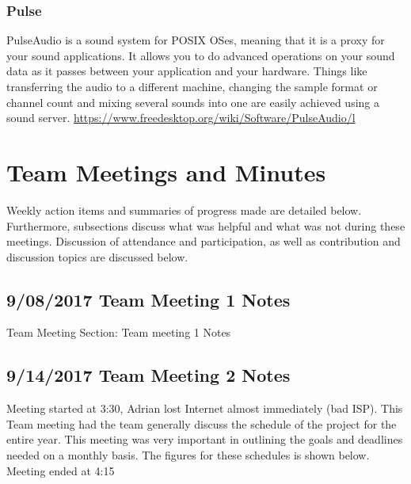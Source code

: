 \documentclass[12pt]{article}
\begin{document}
		\subsubsection{Pulse}
		 PulseAudio is a sound system for POSIX OSes, meaning that it is a proxy for your sound applications. It allows you to do advanced operations on your sound data as it passes between your application and your hardware. Things like transferring the audio to a different machine, changing the sample format or channel count and mixing several sounds into one are easily achieved using a sound server. \url{https://www.freedesktop.org/wiki/Software/PulseAudio/l}
		
	\newpage

\section{Team Meetings and Minutes}
	Weekly action items and summaries of progress made are detailed below. Furthermore, subsections discuss what was helpful and what was not during these meetings. Discussion of attendance and participation, as well as contribution and discussion topics are discussed below.
	
	\subsection{9/08/2017 Team Meeting 1 Notes}
		Team Meeting Section: Team meeting 1 Notes 
	
	\subsection{9/14/2017 Team Meeting 2 Notes}
	Meeting started at 3:30, Adrian lost Internet almost immediately (bad ISP). This Team meeting had the team generally discuss the schedule of the project for the entire year. This meeting was very important in outlining the goals and deadlines needed on a monthly basis. The figures for these schedules is shown below. Meeting ended at 4:15
	
\end{document}
